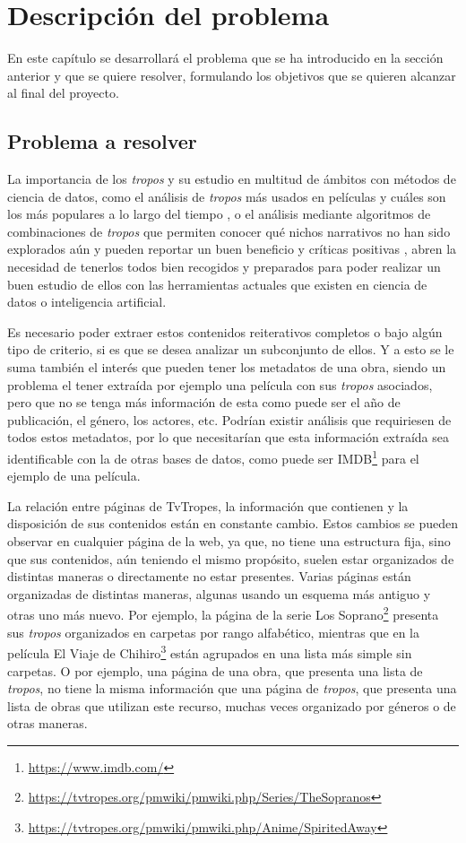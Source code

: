 \chapter{Descripción del problema}
\label{chapter:2}

En este capítulo se desarrollará el problema que se ha introducido en la sección
anterior y que se quiere resolver, formulando los objetivos que se quieren
alcanzar al final del proyecto.

\section{Problema a resolver}
La importancia de los \textit{tropos} y su estudio en multitud de ámbitos con
métodos de ciencia de datos, como el análisis de \textit{tropos} más usados en
películas y cuáles son los más populares a lo largo del tiempo
\cite{garcia2020tropes}, o el análisis mediante algoritmos de combinaciones de
\textit{tropos} que permiten conocer qué nichos narrativos no han sido
explorados aún y pueden reportar un buen beneficio y críticas positivas
\cite{garcia2021simpsons}, abren la necesidad de tenerlos todos bien recogidos y
preparados para poder realizar un buen estudio de ellos con las herramientas
actuales que existen en ciencia de datos o inteligencia artificial. 

Es necesario poder extraer estos contenidos reiterativos completos o bajo algún
tipo de criterio, si es que se desea analizar un subconjunto de ellos. Y a esto
se le suma también el interés que pueden tener los metadatos de una obra, siendo
un problema el tener extraída por ejemplo una película con sus \textit{tropos}
asociados, pero que no se tenga más información de esta como puede ser el año de
publicación, el género, los actores, etc. Podrían existir análisis que
requiriesen de todos estos metadatos, por lo que necesitarían que esta
información extraída sea identificable con la de otras bases de datos, como
puede ser IMDB\footnote{\url{https://www.imdb.com/}} para el ejemplo de una
película.

La relación entre páginas de TvTropes, la información que contienen y la
disposición de sus contenidos están en constante cambio. Estos cambios se pueden
observar en cualquier página de la web, ya que, no tiene una estructura fija,
sino que sus contenidos, aún teniendo el mismo propósito, suelen estar
organizados de distintas maneras o directamente no estar presentes. Varias
páginas están organizadas de distintas maneras, algunas usando un esquema más
antiguo y otras uno más nuevo. Por ejemplo, la página de la serie Los
Soprano\footnote{\url{https://tvtropes.org/pmwiki/pmwiki.php/Series/TheSopranos}}
presenta sus \textit{tropos} organizados en carpetas por rango alfabético,
mientras que  en la película El Viaje de
Chihiro\footnote{\url{https://tvtropes.org/pmwiki/pmwiki.php/Anime/SpiritedAway}}
están agrupados en una lista más simple sin carpetas. O por ejemplo, una página
de una obra, que presenta una lista de \textit{tropos}, no tiene la misma
información que una página de \textit{tropos}, que presenta una lista de obras
que utilizan este recurso, muchas veces organizado por géneros o de otras
maneras.

